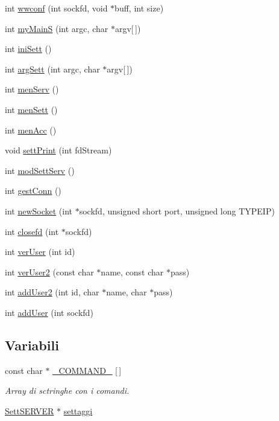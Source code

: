 \begin{DoxyCompactItemize}
int \mbox{\hyperlink{a00050_a0ac2167e23f9cadb1367b63f38e421cc}{wwconf}} (int sockfd, void $\ast$buff, int size)
\item 
int \mbox{\hyperlink{a00050_a77c974b2a79a9a1413f9ce1fb1e1a69a}{my\+MainS}} (int argc, char $\ast$argv\mbox{[}$\,$\mbox{]})
\item 
int \mbox{\hyperlink{a00050_a280a493f2edcc08fb9c250acac6163ff}{ini\+Sett}} ()
\item 
int \mbox{\hyperlink{a00050_a169605f11035e9caf2dd6f0479c2dc18}{arg\+Sett}} (int argc, char $\ast$argv\mbox{[}$\,$\mbox{]})
\item 
int \mbox{\hyperlink{a00050_a17b0f14b64d30c318b71f3c797009bef}{men\+Serv}} ()
\item 
int \mbox{\hyperlink{a00050_abd208224f708f66dffe535a706fb8f98}{men\+Sett}} ()
\item 
int \mbox{\hyperlink{a00050_a24cd4cacf089f3d3ad9a0a95df6ed1f9}{men\+Acc}} ()
\item 
void \mbox{\hyperlink{a00050_a97f7da246f13aa6b171eba5834af3e94}{sett\+Print}} (int fd\+Stream)
\item 
int \mbox{\hyperlink{a00050_acd1f4ad00301185734118d32a0ed391b}{mod\+Sett\+Serv}} ()
\item 
int \mbox{\hyperlink{a00050_aee8d8f7af88ed9ef270a00e96a976e30}{gest\+Conn}} ()
\item 
int \mbox{\hyperlink{a00050_a7d98cd038e0cc100b29cb96ddc0b35da}{new\+Socket}} (int $\ast$sockfd, unsigned short port, unsigned long T\+Y\+P\+E\+IP)
\item 
int \mbox{\hyperlink{a00050_a687133bcb442e7bb71461db9ae2c4202}{closefd}} (int $\ast$sockfd)
\item 
int \mbox{\hyperlink{a00050_a068fcd7c3774c56f2fec08bd0e67b8eb}{ver\+User}} (int id)
\item 
int \mbox{\hyperlink{a00050_afb6bcf6d0cbea179df5b49e8cfb1a4ae}{ver\+User2}} (const char $\ast$name, const char $\ast$pass)
\item 
int \mbox{\hyperlink{a00050_ae6d2192d8a6b146b46328f729f3f092b}{add\+User2}} (int id, char $\ast$name, char $\ast$pass)
\item 
int \mbox{\hyperlink{a00050_a3a8de8215b92820b1ceb58270cdc5f3c}{add\+User}} (int sockfd)
\end{DoxyCompactItemize}
\subsection*{Variabili}
\begin{DoxyCompactItemize}
\item 
const char $\ast$ \mbox{\hyperlink{a00050_ad7ed85b86ff98d7a5853304284acd79e}{\+\_\+\+C\+O\+M\+M\+A\+N\+D\+\_\+}} \mbox{[}$\,$\mbox{]}
\begin{DoxyCompactList}\small\item\em Array di sctringhe con i comandi. \end{DoxyCompactList}\item 
\mbox{\hyperlink{a00050_a2ae1b7622ac02fc56c93b1f3911fbd76}{Sett\+S\+E\+R\+V\+ER}} $\ast$ \mbox{\hyperlink{a00050_a9ea2d4cbc5355102c58960d512b000fc}{settaggi}}
\end{DoxyCompactItemize}


